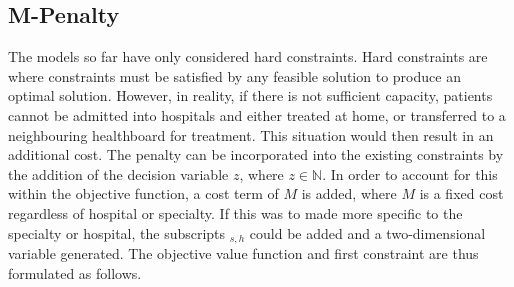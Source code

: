 \documentclass[../thesis.tex]{subfiles}
\begin{document}






\subsection{M-Penalty}\label{sec:scenario2}
The models so far have only considered hard constraints. Hard constraints are where constraints must be satisfied by any feasible solution to produce an optimal solution. However, in reality, if there is not sufficient capacity, patients cannot be admitted into hospitals and either treated at home, or transferred to a neighbouring healthboard for treatment. This situation would then result in an additional cost. The penalty can be incorporated into the existing constraints by the addition of the decision variable $z$, where $z \in \mathbb{N}$. In order to account for this within the objective function, a cost term of $M$ is added, where $M$ is a fixed cost regardless of hospital or specialty. If this was to made more specific to the specialty or hospital, the subscripts $_{s,h}$ could be added and a two-dimensional variable generated. The objective value function and first constraint are thus formulated as follows.
\end{document}
